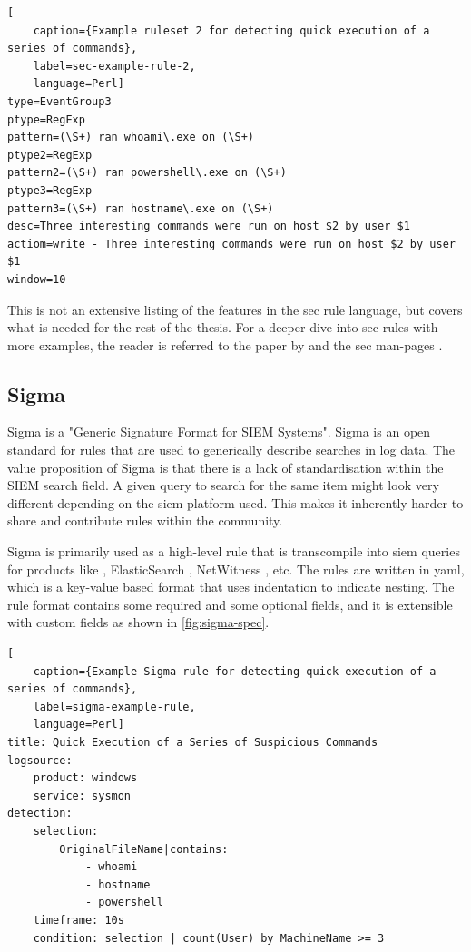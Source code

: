 \begin{lstlisting}[
    caption={Example ruleset 2 for detecting quick execution of a series of commands},
    label=sec-example-rule-2,
    language=Perl]
type=EventGroup3
ptype=RegExp
pattern=(\S+) ran whoami\.exe on (\S+)
ptype2=RegExp
pattern2=(\S+) ran powershell\.exe on (\S+)
ptype3=RegExp
pattern3=(\S+) ran hostname\.exe on (\S+)
desc=Three interesting commands were run on host $2 by user $1
actiom=write - Three interesting commands were run on host $2 by user $1
window=10
\end{lstlisting}

This is not an extensive listing of the features in the \acrshort{sec} rule language, but covers what is needed for the rest of the thesis. For a deeper dive into \acrshort{sec} rules with more examples, the reader is referred to the paper  by \textcite{rouillard2004real} and the \acrshort{sec} man-pages \cite{secman}.

\subsection{Sigma}
\label{sub:sigma}
Sigma is a "Generic Signature Format for SIEM Systems"\cite{Sigma}. Sigma is an open standard for rules that are used to generically describe searches in log data. The value proposition of Sigma is that there is a lack of standardisation within the SIEM search field. A given query to search for the same item might look very different depending on the \acrshort{siem} platform used. This makes it inherently harder to share and contribute rules within the community. 

Sigma is primarily used as a high-level rule that is transcompile into \acrshort{siem} queries for products like \textcite{Splunk}, ElasticSearch \cite{ElasticS68:online}, NetWitness \cite{NetWitness}, etc. The rules are written in \acrfull{yaml}\cite{yaml}, which is a key-value based format that uses indentation to indicate nesting. The rule format contains some required and some optional fields, and it is extensible with custom fields as shown in \cref{fig:sigma-spec}.

\begin{lstlisting}[
    caption={Example Sigma rule for detecting quick execution of a series of commands},
    label=sigma-example-rule,
    language=Perl]
title: Quick Execution of a Series of Suspicious Commands
logsource:
    product: windows
    service: sysmon
detection:
    selection:
        OriginalFileName|contains:
            - whoami
            - hostname
            - powershell
    timeframe: 10s
    condition: selection | count(User) by MachineName >= 3
\end{lstlisting}

